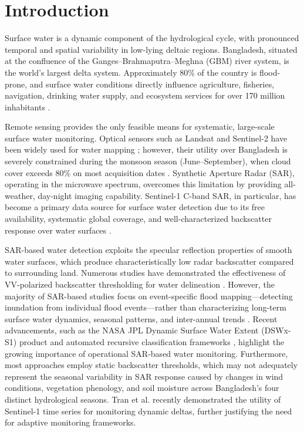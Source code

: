 \documentclass[fleqn,10pt]{article}
\begin{document}
\section{Introduction}

Surface water is a dynamic component of the hydrological cycle, with pronounced temporal and spatial variability in low-lying deltaic regions. Bangladesh, situated at the confluence of the Ganges--Brahmaputra--Meghna (GBM) river system, is the world's largest delta system. Approximately 80\% of the country is flood-prone, and surface water conditions directly influence agriculture, fisheries, navigation, drinking water supply, and ecosystem services for over 170 million inhabitants \cite{brammer2014, akter2016, roy2023, gourdji2015}.

Remote sensing provides the only feasible means for systematic, large-scale surface water monitoring. Optical sensors such as Landsat and Sentinel-2 have been widely used for water mapping \cite{pekel2016, pickens2020}; however, their utility over Bangladesh is severely constrained during the monsoon season (June--September), when cloud cover exceeds 80\% on most acquisition dates \cite{uddin2019, hassan2021}. Synthetic Aperture Radar (SAR), operating in the microwave spectrum, overcomes this limitation by providing all-weather, day-night imaging capability. Sentinel-1 C-band SAR, in particular, has become a primary data source for surface water detection due to its free availability, systematic global coverage, and well-characterized backscatter response over water surfaces \cite{torres2012, twele2016, haghighi2022, sayed2023}.

SAR-based water detection exploits the specular reflection properties of smooth water surfaces, which produce characteristically low radar backscatter compared to surrounding land. Numerous studies have demonstrated the effectiveness of VV-polarized backscatter thresholding for water delineation \cite{twele2016, bioresita2018, martinis2009, hossain2024}. However, the majority of SAR-based studies focus on event-specific flood mapping---detecting inundation from individual flood events---rather than characterizing long-term surface water dynamics, seasonal patterns, and inter-annual trends \cite{devries2020}. Recent advancements, such as the NASA JPL Dynamic Surface Water Extent (DSWx-S1) product \cite{nasa2024} and automated recursive classification frameworks \cite{markert2020, ogrady2021}, highlight the growing importance of operational SAR-based water monitoring. Furthermore, most approaches employ static backscatter thresholds, which may not adequately represent the seasonal variability in SAR response caused by changes in wind conditions, vegetation phenology, and soil moisture across Bangladesh's four distinct hydrological seasons. Tran et al. \cite{tran2024} recently demonstrated the utility of Sentinel-1 time series for monitoring dynamic deltas, further justifying the need for adaptive monitoring frameworks.
\end{document}
